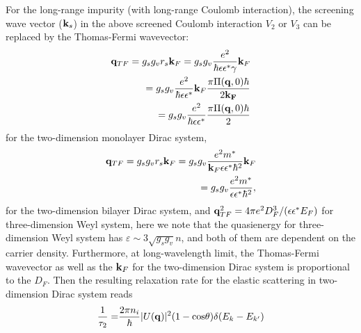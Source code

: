\documentclass[UTF8,a4paper]{article}
\begin{document}
\begin{large}
For the long-range impurity (with long-range Coulomb interaction),
the screening wave vector (${\bf k}_{s}$) in the above screened Coulomb interaction $V_{2}$ or $V_{3}$ can be replaced by the Thomas-Fermi wavevector:
\begin{equation} 
\begin{aligned}
{\bf q}_{TF}=g_{s}g_{v}r_{s}{\bf k}_{F}=g_{s}g_{v}\frac{e^{2}}{\hbar \epsilon\epsilon^{*}\gamma}{\bf k}_{F}\\
=g_{s}g_{v}\frac{e^{2}}{\hbar \epsilon\epsilon^{*}}{\bf k}_{F}\frac{\pi\Pi({\bf q},0)\hbar}{2{\bf k_{F}}}\\
=g_{s}g_{v}\frac{e^{2}}{\hbar \epsilon\epsilon^{*}}\frac{\pi\Pi({\bf q},0)\hbar}{2}
\end{aligned}
\end{equation}
for the two-dimension monolayer Dirac system, 
\begin{equation} 
\begin{aligned}
{\bf q}_{TF}=g_{s}g_{v}r_{s}{\bf k}_{F}=g_{s}g_{v}\frac{e^{2}m^{*}}{{\bf k}_{F}\epsilon\epsilon^{*}\hbar^{2}}{\bf k}_{F}\\
=g_{s}g_{v}\frac{e^{2}m^{*}}{\epsilon\epsilon^{*}\hbar^{2}},\\
\end{aligned}
\end{equation}
for the two-dimension bilayer Dirac system, 
and 
${\bf q}^{2}_{TF}=4\pi e^{2}D_{F}^{3}/(\epsilon\epsilon^{*}E_{F})$ for three-dimension Weyl system\cite{Burkov A A},
here we note that the quasienergy for three-dimension Weyl system has $\varepsilon\sim 3\sqrt{g_{s}g_{v}}n$,
and both of them are dependent on the carrier density.
Furthermore, at long-wavelength limit, the Thomas-Fermi wavevector as well as the ${\bf k}_{F}$ for the two-dimension Dirac system is 
proportional to the $D_{F}$.
Then the resulting relaxation rate for the elastic scattering in two-dimension Dirac system reads
\begin{equation} 
\begin{aligned}
\frac{1}{\tau_{2}}=&\frac{2\pi n_{i}}{\hbar}|U({\bf q})|^{2}(1-{\rm cos}\theta)\delta(E_{k}-E_{k'})\\
\end{aligned}

\end{equation}
\end{large}
\end{document}
